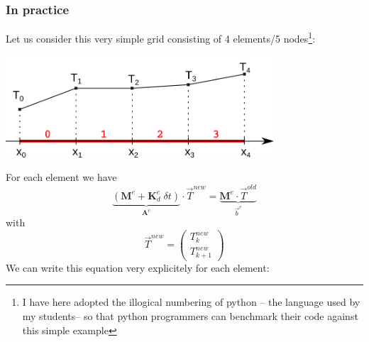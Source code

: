 \subsubsection{In practice}

Let us consider this very simple grid consisting of 4 elements/5 nodes\footnote{I have here adopted the illogical 
numbering of python -- the language used by my students-- 
so that python programmers can benchmark their code against this simple example}:
\begin{center}
\includegraphics[width=10cm]{images/oneD/grid5}
\end{center}
For each element we have 
\[
\underbrace{( {\bm M}^e +  {\bm K}_d^e \; \delta t )}_{\bm A^{e}} \cdot {\vec T}^{new} =  \underbrace{{\bm M}^e \cdot  {\vec T}^{old} }_{\vec b^{e}}
\]
with 
\[
\vec{T}^{new}=
\left(
\begin{array}{c}
T_k^{new} \\ T_{k+1}^{new}
\end{array}
\right)
\]
We can write this equation very explicitely for each element:
